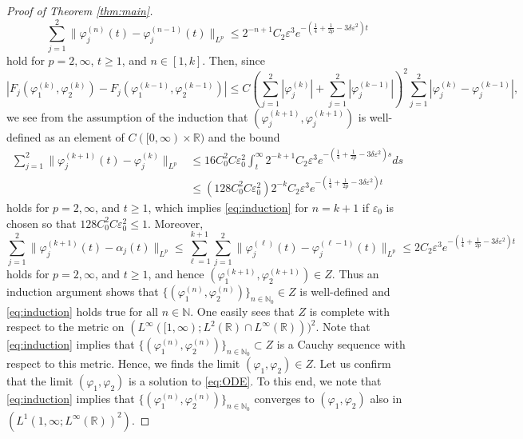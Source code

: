 \documentclass[11pt,a4paper,twosides]{amsart}
\theoremstyle{plain}
\theoremstyle{remark}
\numberwithin{equation}{section}
\newcommand{\R}{\mathbb{R}}
\newcommand{\N}{\mathbb{N}}
\def\le{\leqslant}
\def\ge{\geqslant}
\theoremstyle{definition}
\newcommand{\1}{{\bf 1}_{\{|x| < |t|\}}}
\renewcommand{\phi}{\varphi}
\renewcommand{\epsilon}{\varepsilon}
\begin{document}
\begin{proof}[Proof of Theorem \ref{thm:main}]
  \begin{equation}\label{eq:induction}
    \sum_{j=1}^2\|\phi^{(n)}_j(t) - \phi^{(n-1)}_j(t)\|_{L^p} \le 2^{-n+1}C_2\epsilon^3e^{-(\frac14+\frac{1}{2p}-3\delta\epsilon^2)t}
  \end{equation}
  hold for $p=2, \infty$, $t \ge 1$, and $n \in [1,k]$. Then, since
  \[
    |F_j(\phi^{(k)}_1, \phi^{(k)}_2) - F_j(\phi^{(k-1)}_1, \phi^{(k-1)}_2)|
    \le C\left(
    \sum_{j=1}^2|\phi^{(k)}_j| + \sum_{j=1}^2|\phi^{(k-1)}_j|
    \right)^2
    \sum_{j=1}^2|\phi^{(k)}_j - \phi^{(k-1)}_j|,
  \]
  we see from the assumption of the induction that $(\phi^{(k+1)}_j, \phi^{(k+1)}_j)$ is well-defined
  as an element of $C([0,\infty) \times \R)$ and the bound
  \begin{align*}
    \sum_{j=1}^2\|\phi^{(k+1)}_j(t) - \phi^{(k)}_j\|_{L^p}
     & \le 16C_0^2C\epsilon^2_0
     \int_t^\infty2^{-k+1}C_2\epsilon^3
     e^{-(\frac{1}{4}
    + \frac{1}{2p}-3\delta\epsilon^2)s}ds                                                           \\
     & \le (128C_0^2C\epsilon_0^2)2^{-k}
     C_2\epsilon^3e^{-(\frac14 + \frac{1}{2p}-3\delta\epsilon^2)t}
  \end{align*}
  holds for $p = 2, \infty$, and $t \ge 1$, which implies \eqref{eq:induction} for $n = k+1$
  if $\epsilon_0$ is chosen so that $128C_0^2C\epsilon_0^2 \le 1$. Moreover,
  \begin{equation} \nonumber
    \sum_{j=1}^2\|\phi_j^{(k+1)}(t) - \alpha_j(t)\|_{L^p}
    \le \sum_{\ell =1}^{k+1}\sum_{j=1}^2\|\phi_j^{(\ell)}(t) - \phi_j^{(\ell-1)}(t)\|_{L^p}
    \le 2C_2\epsilon^3e^{-(\frac{1}{4}+\frac{1}{2p}-3\delta\epsilon^2)t}
  \end{equation}
  holds for $p = 2, \infty$, and $t \ge 1$, and hence $(\phi_1^{(k+1)}, \phi_2^{(k+1)}) \in Z$.
  Thus an induction argument shows that $\{(\phi_1^{(n)}, \phi_2^{(n)})\}_{n \in \N_0} \in Z$
  is well-defined and \eqref{eq:induction} holds true for all $n \in \N$.
  One easily sees that $Z$ is complete with respect to the metric on $(L^\infty([1,\infty);L^2(\R)\cap L^\infty(\R)))^2$.
  Note that \eqref{eq:induction} implies that $\{(\phi_1^{(n)}, \phi_2^{(n)})\}_{n \in \N_0} \subset Z$ is
  a Cauchy sequence with respect to this metric. Hence, we finds the limit $(\phi_1, \phi_2)\in Z$.
  Let us confirm that the limit $(\phi_1, \phi_2)$ is a solution to \eqref{eq:ODE}.
  To this end, we note that \eqref{eq:induction} implies that $\{(\phi_1^{(n)}, \phi_2^{(n)})\}_{n \in \N_0}$
  converges to $(\phi_1, \phi_2)$ also in $(L^1(1,\infty;L^\infty(\R))^2)$.

\end{proof}
\end{document}
